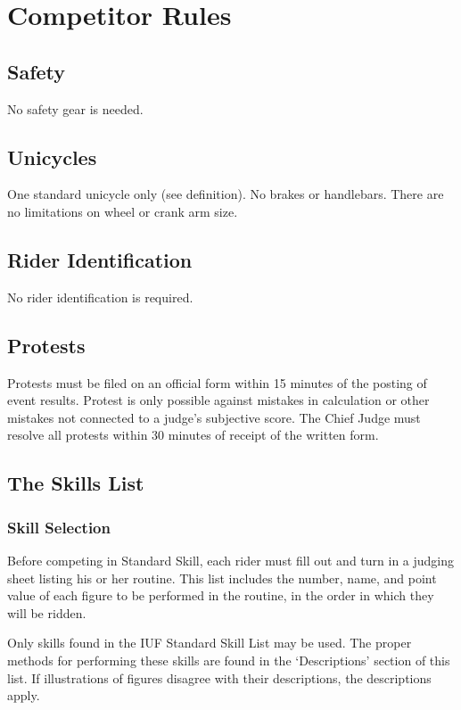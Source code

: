 \chapter{Competitor Rules}

\section{Safety}

No safety gear is needed.

\section{Unicycles}

One standard unicycle only (see definition).
No brakes or handlebars.
There are no limitations on wheel or crank arm size.

\section{Rider Identification}

No rider identification is required.

\section{Protests}

Protests must be filed on an official form within 15 minutes of the posting of event results.
Protest is only possible against mistakes in calculation or other mistakes not connected to a judge's subjective score.
The Chief Judge must resolve all protests within 30 minutes of receipt of the written form.

\section{The Skills List}

\subsection{Skill Selection}
Before competing in Standard Skill, each rider must fill out and turn in a judging sheet listing his or her routine.
This list includes the number, name, and point value of each figure to be performed in the routine, in the order in which they will be ridden.

Only skills found in the IUF Standard Skill List may be used.
The proper methods for performing these skills are found in the `Descriptions' section of this list.
If illustrations of figures disagree with their descriptions, the descriptions apply.

